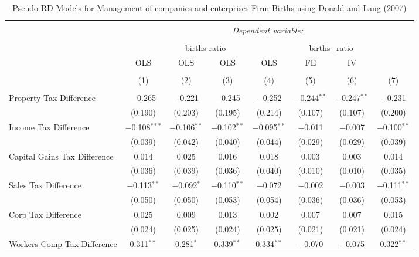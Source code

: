 
\begin{table}[!htbp] \centering 
  \caption{Pseudo-RD Models for  Management of companies and enterprises Firm Births using Donald and Lang (2007)} 
  \label{} 
\begin{tabular}{@{\extracolsep{5pt}}lccccccc} 
\\[-1.8ex]\hline 
\hline \\[-1.8ex] 
 & \multicolumn{7}{c}{\textit{Dependent variable:}} \\ 
\cline{2-8} 
\\[-1.8ex] & \multicolumn{4}{c}{births ratio} & \multicolumn{2}{c}{births\_ratio} &   \\ 
 & OLS & OLS & OLS & OLS & FE & IV &  \\ 
\\[-1.8ex] & (1) & (2) & (3) & (4) & (5) & (6) & (7)\\ 
\hline \\[-1.8ex] 
 Property Tax Difference & $-$0.265 & $-$0.221 & $-$0.245 & $-$0.252 & $-$0.244$^{**}$ & $-$0.247$^{**}$ & $-$0.231 \\ 
  & (0.190) & (0.203) & (0.195) & (0.214) & (0.107) & (0.107) & (0.200) \\ 
  Income Tax Difference & $-$0.108$^{***}$ & $-$0.106$^{**}$ & $-$0.102$^{**}$ & $-$0.095$^{**}$ & $-$0.011 & $-$0.007 & $-$0.100$^{**}$ \\ 
  & (0.039) & (0.042) & (0.040) & (0.044) & (0.029) & (0.029) & (0.039) \\ 
  Capital Gains Tax Difference & 0.014 & 0.025 & 0.016 & 0.018 & 0.003 & 0.003 & 0.014 \\ 
  & (0.036) & (0.039) & (0.036) & (0.040) & (0.010) & (0.010) & (0.035) \\ 
  Sales Tax Difference & $-$0.113$^{**}$ & $-$0.092$^{*}$ & $-$0.110$^{**}$ & $-$0.072 & $-$0.002 & $-$0.003 & $-$0.111$^{**}$ \\ 
  & (0.050) & (0.050) & (0.053) & (0.054) & (0.036) & (0.036) & (0.053) \\ 
  Corp Tax Difference & 0.025 & 0.009 & 0.013 & 0.002 & 0.007 & 0.007 & 0.015 \\ 
  & (0.024) & (0.025) & (0.024) & (0.025) & (0.021) & (0.021) & (0.024) \\ 
  Workers Comp Tax Difference & 0.311$^{**}$ & 0.281$^{*}$ & 0.339$^{**}$ & 0.334$^{**}$ & $-$0.070 & $-$0.075 & 0.322$^{**}$ \\ 

\end{tabular}
\end{table}
